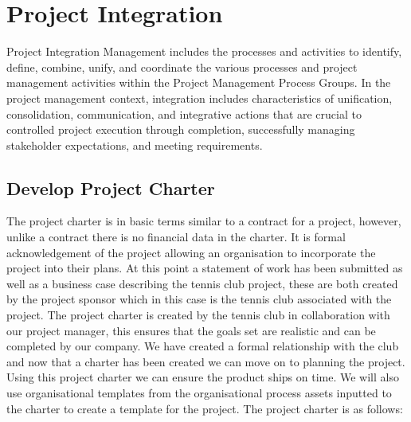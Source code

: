 \chapter{Project Integration}

Project Integration Management includes the processes and activities to identify, define, combine, unify, and coordinate the various processes and project management activities within the Project Management Process Groups. In the project management context, integration includes characteristics of unification, consolidation, communication, and integrative actions that are crucial to controlled project execution through completion, successfully managing stakeholder expectations, and meeting requirements. \parencite{pmbok}

\section{Develop Project Charter}

The project charter is in basic terms similar to a contract for a project, however, unlike a contract there is no financial data in the charter. It is formal acknowledgement of the project allowing an organisation to incorporate the project into their plans.
At this point a statement of work has been submitted as well as a business case describing the tennis club project, these are both created by the project sponsor which in this case is the tennis club associated with the project. The project charter is created by the tennis club in collaboration with our project manager, this ensures that the goals set are realistic and can be completed by our company. We have created a formal relationship with the club and now that a charter has been created we can move on to planning the project. Using this project charter we can ensure the product ships on time.
We will also use organisational templates from the organisational process assets inputted to the charter to create a template for the project.
The project charter is as follows:

